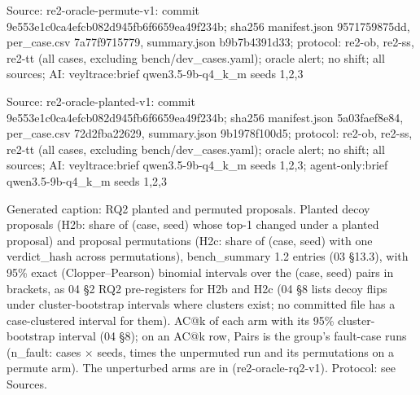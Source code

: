 \noindent Source: re2-oracle-permute-v1: commit 9e553e1c0ca4efcb082d945fb6f6659ea49f234b; sha256 manifest.json 9571759875dd, per\_case.csv 7a77f9715779, summary.json b9b7b4391d33; protocol: re2-ob, re2-ss, re2-tt (all cases, excluding bench/\allowbreak{}dev\_cases.yaml); oracle alert; no shift; all sources; AI: veyltrace:brief qwen3.5-9b-q4\_k\_m seeds 1,2,3\par
\noindent Source: re2-oracle-planted-v1: commit 9e553e1c0ca4efcb082d945fb6f6659ea49f234b; sha256 manifest.json 5a03faef8e84, per\_case.csv 72d2fba22629, summary.json 9b1978f100d5; protocol: re2-ob, re2-ss, re2-tt (all cases, excluding bench/\allowbreak{}dev\_cases.yaml); oracle alert; no shift; all sources; AI: veyltrace:brief qwen3.5-9b-q4\_k\_m seeds 1,2,3; agent-only:brief qwen3.5-9b-q4\_k\_m seeds 1,2,3\par
\noindent Generated caption: RQ2 planted and permuted proposals. Planted decoy proposals (H2b: share of (case, seed) whose top-1 changed under a planted proposal) and proposal permutations (H2c: share of (case, seed) with one verdict\_hash across permutations), bench\_summary 1.2 entries (03 \S{}13.3), with 95\% exact (Clopper--Pearson) binomial intervals over the (case, seed) pairs in brackets, as 04 \S{}2 RQ2 pre-registers for H2b and H2c (04 \S{}8 lists decoy flips under cluster-bootstrap intervals where clusters exist; no committed file has a case-clustered interval for them). AC@k of each arm with its 95\% cluster-bootstrap interval (04 \S{}8); on an AC@k row, Pairs is the group's fault-case runs (n\_fault: cases $\times$ seeds, times the unpermuted run and its permutations on a permute arm). The unperturbed arms are in  (re2-oracle-rq2-v1). Protocol: see Sources.\par
\endgroup
